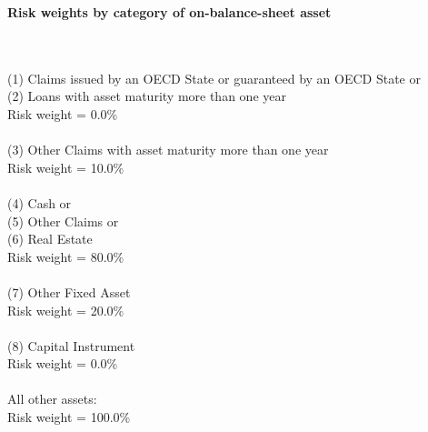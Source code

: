 \documentclass{article}
\begin{document}
\setlength{\parindent}{0em}
\begin{center}{\bf Risk weights by category of on-balance-sheet asset}\end{center}
~\\
~\\

(1) Claims issued by an OECD State or guaranteed by an OECD State or \\
(2) Loans with asset maturity more than one year \\
Risk weight = 0.0\%\\

~\\
(3) Other Claims with asset maturity more than one year \\
Risk weight = 10.0\%\\

~\\
(4) Cash or \\
(5) Other Claims or \\
(6) Real Estate\\
Risk weight = 80.0\%\\

~\\
(7) Other Fixed Asset \\
Risk weight = 20.0\%\\

~\\
(8) Capital Instrument \\
Risk weight = 0.0\%\\

~\\
All other assets:\\
Risk weight = 100.0\%\\

~\\
\end{document}

